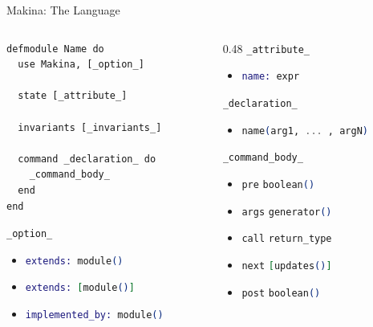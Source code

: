 \documentclass[aspectratio=169, 10pt]{beamer}
\begin{document}
\begin{frame}[label={sec:orge4e06c2},fragile]{Makina: The Language}
 \begin{columns}
\begin{column}{0.48\columnwidth}
\onslide<+->
\lstset{language=elixir,label= ,caption= ,captionpos=b,numbers=none,style=display}
\begin{lstlisting}
defmodule Name do
  use Makina, [_option_]

  state [_attribute_]

  invariants [_invariants_]

  command _declaration_ do
    _command_body_
  end
end
\end{lstlisting}
\vspace{10pt}
\onslide<+->
\lstinline[language=elixir, style=display]~_option_~
\begin{itemize}
\item \lstinline[language=elixir, style=display]~extends: module()~
\item \lstinline[language=elixir, style=display]~extends: [module()]~
\item \lstinline[language=elixir, style=display]~implemented_by: module()~
\end{itemize}
\end{column}

\begin{column}{0.48\columnwidth}
\onslide<+->
\lstinline[language=elixir, style=display]~_attribute_~
\begin{itemize}
\item \lstinline[language=elixir, style=display]~name: expr~
\end{itemize}
\onslide<+->
\vspace{10pt}
\lstinline[language=elixir, style=display]~_declaration_~
\begin{itemize}
\item \lstinline[language=elixir, style=display]~name(arg1, ... , argN)~
\end{itemize}
\onslide<+->
\vspace{10pt}
\lstinline[language=elixir, style=display]~_command_body_~
\begin{itemize}
\item \lstinline[language=elixir, style=display]~pre~    \lstinline[language=elixir, style=display]~boolean()~
\item \lstinline[language=elixir, style=display]~args~   \lstinline[language=elixir, style=display]~generator()~
\item \lstinline[language=elixir, style=display]~call~   \lstinline[language=elixir, style=display]~return_type~
\item \lstinline[language=elixir, style=display]~next~   \lstinline[language=elixir, style=display]~[updates()]~
\item \lstinline[language=elixir, style=display]~post~   \lstinline[language=elixir, style=display]~boolean()~
\end{itemize}
\end{column}
\end{columns}
\end{frame}
\end{document}
